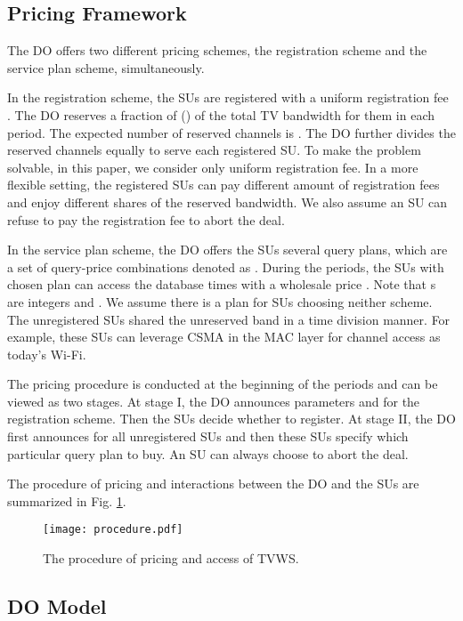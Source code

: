 \documentclass[journal]{IEEEtran}
\begin{document}
\subsection{Pricing Framework}
\label{subsec:framework}

The DO offers two different pricing schemes, the registration scheme and the service plan scheme, simultaneously.

In the registration scheme, the SUs are registered with a uniform registration fee . The DO reserves a fraction of  () of the total TV bandwidth for them in each period. The expected number of reserved channels is . The DO further divides the reserved channels equally to serve each registered SU. To make the problem solvable, in this paper, we consider only uniform registration fee. In a more flexible setting, the registered SUs can pay different amount of registration fees and enjoy different shares of the reserved bandwidth.
We also assume an SU can refuse to pay the registration fee to abort the deal.

In the service plan scheme, the DO offers the SUs several query plans, which are a set of  query-price combinations denoted as . During the  periods, the SUs with chosen plan  can access the database  times with a wholesale price .
Note that s are integers and .
We assume there is a plan  for SUs choosing neither scheme. The unregistered SUs shared the unreserved band in a time division manner. For example, these SUs can leverage CSMA in the MAC layer for channel access as today's Wi-Fi.

The pricing procedure is conducted at the beginning of the  periods and can be viewed as two stages. At stage I, the DO announces parameters  and  for the registration scheme. Then the SUs decide whether to register. At stage II, the DO first announces  for all unregistered SUs and then these SUs specify which particular query plan to buy. An SU can always choose  to abort the deal.

The procedure of pricing and interactions between the DO and the SUs are summarized in Fig. \ref{fig:procedure}.

\begin{figure}[tp]
\centering
  \texttt{[image: procedure.pdf]}\\
  \caption{The procedure of pricing and access of TVWS.}
  \label{fig:procedure}
  \vspace{-0.0cm}
\end{figure}

\subsection{DO Model}
\label{subsec:DO}
\end{document}
